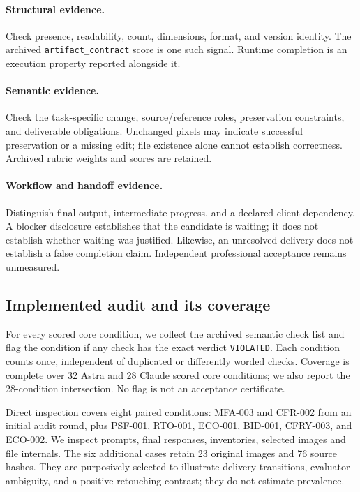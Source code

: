 \paragraph{Structural evidence.}
Check presence, readability, count, dimensions, format, and version identity. The archived \texttt{artifact\_contract} score is one such signal. Runtime completion is an execution property reported alongside it.

\paragraph{Semantic evidence.}
Check the task-specific change, source/reference roles, preservation constraints, and deliverable obligations. Unchanged pixels may indicate successful preservation or a missing edit; file existence alone cannot establish correctness. Archived rubric weights and scores are retained.

\paragraph{Workflow and handoff evidence.}
Distinguish final output, intermediate progress, and a declared client dependency. A blocker disclosure establishes that the candidate is waiting; it does not establish whether waiting was justified. Likewise, an unresolved delivery does not establish a false completion claim. Independent professional acceptance remains unmeasured.

\subsection{Implemented audit and its coverage}
For every scored core condition, we collect the archived semantic check list and flag the condition if any check has the exact verdict \texttt{VIOLATED}. Each condition counts once, independent of duplicated or differently worded checks. Coverage is complete over 32 Astra and 28 Claude scored core conditions; we also report the 28-condition intersection. No flag is not an acceptance certificate.

Direct inspection covers eight paired conditions: MFA-003 and CFR-002 from an initial audit round, plus PSF-001, RTO-001, ECO-001, BID-001, CFRY-003, and ECO-002. We inspect prompts, final responses, inventories, selected images and file internals. The six additional cases retain 23 original images and 76 source hashes. They are purposively selected to illustrate delivery transitions, evaluator ambiguity, and a positive retouching contrast; they do not estimate prevalence.

